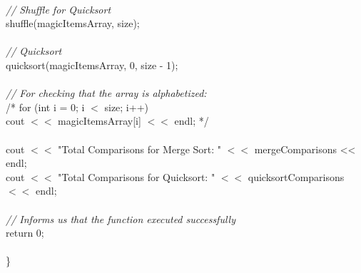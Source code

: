 \documentclass{article}
\begin{document}
\begin {linenumbers}
{\\
    \textit{\indent // Shuffle for Quicksort\\}
    \indent shuffle(magicItemsArray, size);\\
\\
    \textit{\indent // Quicksort\\}
    \indent quicksort(magicItemsArray, 0, size - 1);\\
\\
    \textit{\indent // For checking that the array is alphabetized:\\}
    \indent /* for (int i = 0; i $<$ size; i++) \\
        \indent \indent cout $<<$ magicItemsArray[i] $<<$ endl; */\\
\\
    \indent cout $<<$ "Total Comparisons for Merge Sort: " $<<$ mergeComparisons << endl;\\
    \indent cout $<<$ "Total Comparisons for Quicksort: " $<<$ quicksortComparisons $<<$ endl;\\
\\
    \textit{\indent // Informs us that the function executed successfully\\}
    \indent return 0;\\
\\\}}
\end {linenumbers}
\end{document}
